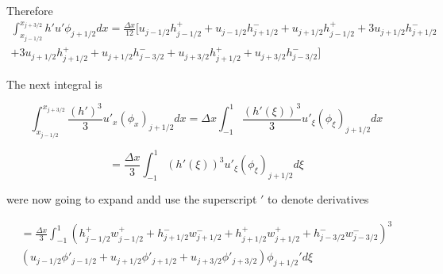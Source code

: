 \documentclass[12pt]{article}
\begin{document}
Therefore
\begin{multline}
\int_{x_{j-1/2}}^{x_{j+3/2}} h'u'\phi_{j+1/2} dx= \frac{\Delta x}{12} \bigg[ u_{j- 1/2}h^+_{j- 1/2} + u_{j- 1/2}h^-_{j+ 1/2}
+  u_{j+1/2}h^+_{j- 1/2} + 3u_{j+1/2}h^-_{j+ 1/2} \\ + 3u_{j+1/2} h^+_{j+ 1/2}  + u_{j+1/2} h^-_{j- 3/2}
+u_{j+ 3/2}h^+_{j+ 1/2} + u_{j+ 3/2}h^-_{j- 3/2} \bigg]
\end{multline}

The next integral is 

\[\int_{x_{j-1/2}}^{x_{j+3/2}}\frac{(h')^3}{3}u'_{x}(\phi_{x})_{j+1/2}dx = \Delta x \int_{-1}^{1} \frac{(h'(\xi))^3}{3}u'_{\xi}(\phi_{\xi})_{j+1/2}dx\]

\[ = \frac{\Delta x}{3} \int_{-1}^{1} (h'(\xi))^3u'_{\xi}(\phi_{\xi})_{j+1/2}d\xi\]

were now going to expand andd use the superscript $'$ to denote derivatives

\begin{multline}
= \frac{\Delta x}{3} \int_{-1}^{1} \left(h^+_{j- 1/2}w^+_{j - 1/2} + h^-_{j+ 1/2}w^-_{j + 1/2} + h^+_{j+ 1/2}w^+_{j + 1/2} + h^-_{j- 3/2}w^-_{j - 3/2}\right)^3 \\ \left(u_{j- 1/2}\phi'_{j - 1/2} + u_{j+1/2}\phi'_{j+1/2} +u_{j+ 3/2}\phi'_{j+ 3/2} \right)\phi_{j+1/2}'d\xi
\end{multline}
\end{document}
